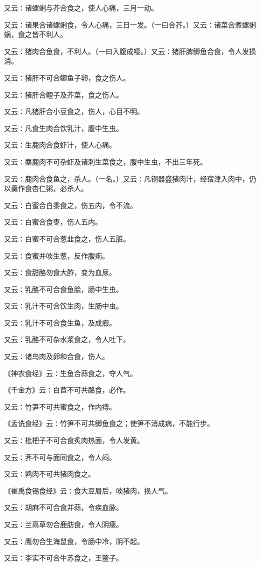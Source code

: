 \documentclass[a4paper,12pt,UTF8,twoside]{ctexbook}
\begin{document}
又云∶诸螺蜊与芥合食之，使人心痛，三月一动。

又云∶诸果合诸螺蜊食，令人心痛，三日一发。（一曰合芥。）又云∶诸菜合煮螺蜊蜗，食之皆不利人。

又云∶猪肉合鱼食，不利人。（一曰入腹成噎。）又云∶猪肝脾鲫鱼合食，令人发损消。

又云∶猪肝不可合鲫鱼子卵，食之伤人。

又云∶猪肝合鲤子及芥菜，食之伤人。

又云∶凡猪肝合小豆食之，伤人，心目不明。

又云∶凡食生肉合饮乳汁，腹中生虫。

又云∶生鹿肉合食虾汁，使人心痛。

又云∶麋鹿肉不可杂虾及诸刺生菜食之，腹中生虫，不出三年死。

又云∶鹿肉合食鱼之，杀人。（一名。）又云∶凡铜器盛猪肉汁，经宿津入肉中，仍以羹作食杏仁粥，必杀人。

又云∶白蜜合白黍食之，伤五内，令不流。

又云∶白蜜合食枣，伤人五内。

又云∶白蜜不可合葱韭食之，伤人五脏。

又云∶食蜜并啖生葱，反作腹痢。

又云∶食甜酪勿食大酢，变为血尿。

又云∶乳酪不可合食鱼脍，肠中生虫。

又云∶乳汁不可合饮生肉，生肠中虫。

又云∶乳汁不可合食生鱼，及成瘕。

又云∶乳酪不可杂水浆食之，令人吐下。

又云∶诸鸟肉及卵和合食，伤人。

《神农食经》云∶生鱼合蒜食之，夺人气。

《千金方》云∶白苣不可共酪食，必作。

又云∶竹笋不可共蜜食之，作内痔。

《孟诜食经》云∶竹笋不可共鲫鱼食之；使笋不消成病，不能行步。

又云∶枇杷子不可合食炙肉热面，令人发黄。

又云∶荠不可与面同食之，令人闷。

又云∶鹑肉不可共猪肉食之。

《崔禹食锡食经》云∶食大豆屑后，啖猪肉，损人气。

又云∶胡麻不可合食并蒜，令疾血脉。

又云∶兰鬲草勿合鹿肪食，令人阴痿。

又云∶鹰勿合生海鼠食，令肠中冷，阴不起。

又云∶李实不可合牛苏食之，王鳖子。
\end{document}
